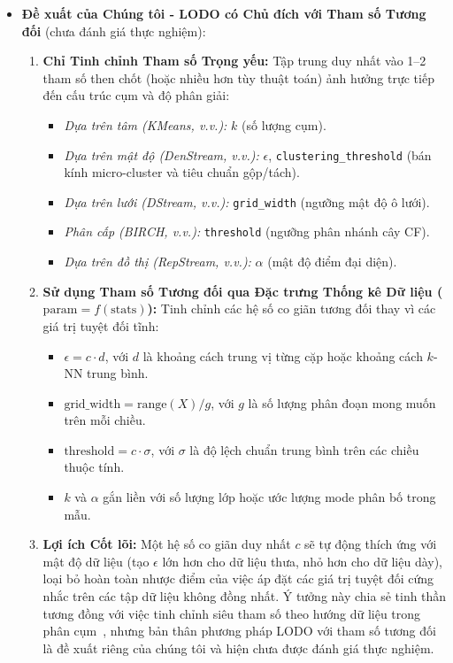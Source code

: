 \begin{enumerate}[label=\textbf{C\arabic*.},leftmargin=2.2em]
\begin{itemize}[leftmargin=1.2em,itemsep=2pt,topsep=1pt]
    \item \textbf{Đề xuất của Chúng tôi - LODO có Chủ đích với Tham số Tương đối} (chưa đánh giá thực nghiệm):
    \begin{enumerate}[label=(\alph*),leftmargin=1.4em,itemsep=2pt]
      \item \textbf{Chỉ Tinh chỉnh Tham số Trọng yếu:} Tập trung duy nhất vào 1--2 tham số then chốt (hoặc nhiều hơn tùy thuật toán) ảnh hưởng trực tiếp đến cấu trúc cụm và độ phân giải:
      \begin{itemize}[leftmargin=1.2em,itemsep=1pt]
        \item \emph{Dựa trên tâm (KMeans, v.v.):} $k$ (số lượng cụm).
        \item \emph{Dựa trên mật độ (DenStream, v.v.):} $\epsilon$, \texttt{clustering\_threshold} (bán kính micro-cluster và tiêu chuẩn gộp/tách).
        \item \emph{Dựa trên lưới (DStream, v.v.):} \texttt{grid\_width} (ngưỡng mật độ ô lưới).
        \item \emph{Phân cấp (BIRCH, v.v.):} \texttt{threshold} (ngưỡng phân nhánh cây CF).
        \item \emph{Dựa trên đồ thị (RepStream, v.v.):} $\alpha$ (mật độ điểm đại diện).
      \end{itemize}
      \item \textbf{Sử dụng Tham số Tương đối qua Đặc trưng Thống kê Dữ liệu ($\text{param} = f(\text{stats})$):} Tinh chỉnh các hệ số co giãn tương đối thay vì các giá trị tuyệt đối tĩnh:
      \begin{itemize}[leftmargin=1.2em,itemsep=1pt]
        \item $\epsilon = c \cdot d$, với $d$ là khoảng cách trung vị từng cặp hoặc khoảng cách $k$-NN trung bình.
        \item $\text{grid\_width} = \text{range}(X) / g$, với $g$ là số lượng phân đoạn mong muốn trên mỗi chiều.
        \item $\text{threshold} = c \cdot \sigma$, với $\sigma$ là độ lệch chuẩn trung bình trên các chiều thuộc tính.
        \item $k$ và $\alpha$ gắn liền với số lượng lớp hoặc ước lượng mode phân bố trong mẫu.
      \end{itemize}
      \item \textbf{Lợi ích Cốt lõi:} Một hệ số co giãn duy nhất $c$ sẽ tự động thích ứng với mật độ dữ liệu (tạo $\epsilon$ lớn hơn cho dữ liệu thưa, nhỏ hơn cho dữ liệu dày), loại bỏ hoàn toàn nhược điểm của việc áp đặt các giá trị tuyệt đối cứng nhắc trên các tập dữ liệu không đồng nhất. Ý tưởng này chia sẻ tinh thần tương đồng với việc tinh chỉnh siêu tham số theo hướng dữ liệu trong phân cụm~\cite{fan2020hyperparameter}, nhưng bản thân phương pháp LODO với tham số tương đối là đề xuất riêng của chúng tôi và hiện chưa được đánh giá thực nghiệm.
    \end{enumerate}
  \end{itemize}
\end{enumerate}
